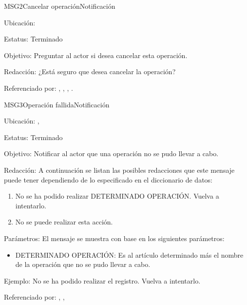 \begin{mensaje}{MSG2}{Cancelar operación}{Notificación}
	\item[Ubicación:] \msjEmergente
	\item[Estatus:] Terminado
	\item[Objetivo:] Preguntar al actor si desea cancelar esta operación.
	\item[Redacción:] ¿Está seguro que desea cancelar la operación?
	\item[Referenciado por:] , , , 
	.
\end{mensaje}

\begin{mensaje}{MSG3}{Operación fallida}{Notificación}
	\item[Ubicación:] \msjSuperior, \msjEmergente
	\item[Estatus:] Terminado
	\item[Objetivo:] Notificar al actor que una operación no se pudo llevar a cabo.
	\item[Redacción:] A continuación se listan las posibles redacciones que este mensaje puede tener dependiendo de lo especificado en el diccionario de datos:
	\begin{enumerate}
		\item No se ha podido realizar DETERMINADO OPERACIÓN. Vuelva a intentarlo.
		\item No se puede realizar esta acción.
	\end{enumerate}

	\item[Parámetros:] El mensaje se muestra con base en los siguientes parámetros:
	\begin{itemize}
		\item DETERMINADO OPERACIÓN: Es al artículo determinado más el nombre de la operación que no se pudo llevar a cabo.
	\end{itemize}
	\item[Ejemplo:] No se ha podido realizar el registro. Vuelva a intentarlo.
	\item[Referenciado por:] 
		,
		,
\end{mensaje}


